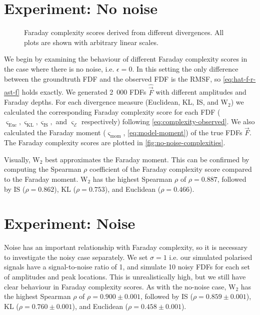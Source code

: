\section{Experiment: No noise}

  \begin{figure*}
    \centering
    \caption{Faraday complexity scores derived from different divergences. All plots are shown with arbitrary linear scales.}
    \label{fig:no-noise-complexities}
  \end{figure*}
  
  We begin by examining the behaviour of different Faraday complexity scores in the case where there is no noise, i.e. $\epsilon = 0$. In this setting the only difference between the groundtruth FDF and the observed FDF is the RMSF, so \autoref{eq:hat-f-r-ast-f} holds exactly. We generated 2~000 FDFs $\hat{\vec{F}}$ with different amplitudes and Faraday depths. For each divergence measure (Euclidean, KL, IS, and W$_2$) we calculated the corresponding Faraday complexity score for each FDF ($\varsigma_{\mathrm{Euc}}, \varsigma_{\mathrm{KL}}, \varsigma_{\mathrm{IS}},$ and $\varsigma_{\mathcal E}$ respectively) following \autoref{eq:complexity-observed}. We also calculated the Faraday moment ($\varsigma_{\mathrm{mom}}$, \autoref{eq:model-moment}) of the true FDFs $\vec F$. The Faraday complexity scores are plotted in \autoref{fig:no-noise-complexities}.

  Visually, W$_2$ best approximates the Faraday moment. This can be confirmed by computing the Spearman $\rho$ coefficient \citeneeded{} of the Faraday complexity score compared to the Faraday moment. W$_2$ has the highest Spearman $\rho$ of $\rho = 0.887$, followed by IS ($\rho = 0.862$), KL ($\rho = 0.753$), and Euclidean ($\rho = 0.466$).

\section{Experiment: Noise}

  Noise has an important relationship with Faraday complexity, so it is necessary to investigate the noisy case separately. We set $\sigma = 1$ i.e. our simulated polarised signals have a signal-to-noise ratio of 1, and simulate 10 noisy FDFs for each set of amplitudes and peak locations. This is unrealistically high, but we still have clear behaviour in Faraday complexity scores. As with the no-noise case, W$_2$ has the highest Spearman $\rho$ of $\rho = 0.900 \pm 0.001$, followed by IS ($\rho = 0.859 \pm 0.001$), KL ($\rho = 0.760 \pm 0.001$), and Euclidean ($\rho = 0.458 \pm 0.001$).


